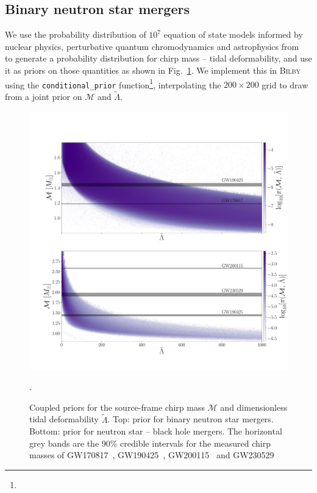 \documentclass[twocolumn]{aastex631}
\begin{document}
	\subsection{Binary neutron star mergers}
	We use the probability distribution of $10^7$ equation of state models informed by nuclear physics, perturbative quantum chromodynamics and  astrophysics from~\citet{altiparmak22} to generate a probability distribution for chirp mass -- tidal deformability, and use it as priors on those quantities as shown in Fig.~\ref{fig:priors}. We implement this in \textsc{Bilby} using the \verb!conditional_prior! function\footnote{},
	interpolating the $200\times200$ grid to draw from a joint prior on $\mathcal{M}$ and $\tilde{\Lambda}$. 
	\begin{figure}
		\centering
		\includegraphics[width=1.\linewidth]{Fig_1_Physics_priors.pdf}
		\caption{Coupled priors for the source-frame chirp mass $\mathcal{M}$ and dimensionless tidal deformability $\tilde{\Lambda}$. Top: prior for binary neutron star mergers. Bottom: prior for neutron star -- black hole mergers. The horizontal grey bands are the 90\% credible intervals for the measured chirp masses of GW170817~\citep{abbott17_170817observation}, GW190425~\citep{abbott20_190425}, GW200115~\citep{GW200115} and GW230529~\citep{GW230529}}. 
		\label{fig:priors}
	\end{figure}
	
\end{document}
